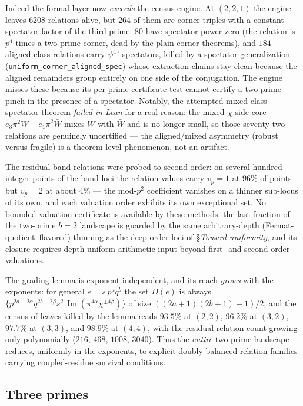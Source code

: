 \documentclass[11pt]{article}
\theoremstyle{remark}
\DeclareMathOperator{\im}{Im}
\begin{document}
Indeed the formal layer now \emph{exceeds} the census engine.  At
$(2,2,1)$ the engine leaves $6208$ relations alive, but $264$ of them
are corner triples with a constant spectator factor of the third
prime: $80$ have spectator power zero (the relation is $p^4$ times a
two-prime corner, dead by the plain corner theorems), and $184$
aligned-class relations carry $\psi^{4\gamma}$ spectators, killed by a
spectator generalization (\texttt{uniform\_corner\_aligned\_spec})
whose extraction chains stay clean because the aligned remainders
group entirely on one side of the conjugation.  The engine misses
these because its per-prime certificate test cannot certify a
two-prime pinch in the presence of a spectator.  Notably, the
attempted mixed-class spectator theorem \emph{failed in Lean} for a
real reason: the mixed $\chi$-side core $e_3\pi^2 W - e_1\bar\pi^2\bar W$
mixes $W$ with $\bar W$ and is no longer small, so those seventy-two
relations are genuinely uncertified — the aligned/mixed asymmetry
(robust versus fragile) is a theorem-level phenomenon, not an artifact.

The residual band relations were probed to second order: on several
hundred integer points of the band loci the relation values carry
$v_p = 1$ at $96\%$ of points but $v_p = 2$ at about $4\%$ — the
mod-$p^2$ coefficient vanishes on a thinner sub-locus of its own, and
each valuation order exhibits its own exceptional set.  No
bounded-valuation certificate is available by these methods: the last
fraction of the two-prime $b=2$ landscape is guarded by the same
arbitrary-depth (Fermat-quotient--flavored) thinning as the deep
order loci of §{\it Toward uniformity}, and its closure requires
depth-uniform arithmetic input beyond first- and second-order
valuations.

The grading lemma is exponent-independent, and its reach \emph{grows}
with the exponents: for general $e = s\,p^aq^b$ the set $D(e)$ is
always $\{p^{2a-2\alpha}q^{2b-2\beta}s^2\,
\im(\pi^{4\alpha}\chi^{\pm4\beta})\}$ of size $((2a{+}1)(2b{+}1)-1)/2$,
and the census of leaves killed by the lemma reads $93.5\%$ at
$(2,2)$, $96.2\%$ at $(3,2)$, $97.7\%$ at $(3,3)$, and $98.9\%$ at
$(4,4)$, with the residual relation count growing only polynomially
($216$, $468$, $1008$, $3040$).  Thus the \emph{entire} two-prime
landscape reduces, uniformly in the exponents, to explicit
doubly-balanced relation families carrying coupled-residue survival
conditions.

\subsection*{Three primes}
\end{document}
